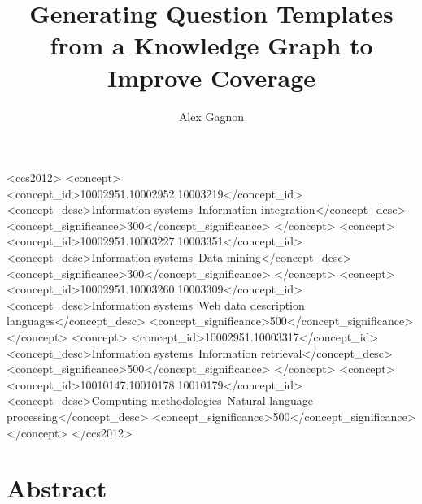 \documentclass[sigplan,screen]{acmart}
\begin{document}
\title{Generating Question Templates from a Knowledge Graph to Improve Coverage}

\author{Alex Gagnon}

\renewcommand{\shortauthors}{Gagnon}

\begin{CCSXML}
  <ccs2012>
     <concept>
         <concept_id>10002951.10002952.10003219</concept_id>
         <concept_desc>Information systems~Information integration</concept_desc>
         <concept_significance>300</concept_significance>
         </concept>
     <concept>
         <concept_id>10002951.10003227.10003351</concept_id>
         <concept_desc>Information systems~Data mining</concept_desc>
         <concept_significance>300</concept_significance>
         </concept>
     <concept>
         <concept_id>10002951.10003260.10003309</concept_id>
         <concept_desc>Information systems~Web data description languages</concept_desc>
         <concept_significance>500</concept_significance>
         </concept>
     <concept>
         <concept_id>10002951.10003317</concept_id>
         <concept_desc>Information systems~Information retrieval</concept_desc>
         <concept_significance>500</concept_significance>
         </concept>
     <concept>
         <concept_id>10010147.10010178.10010179</concept_id>
         <concept_desc>Computing methodologies~Natural language processing</concept_desc>
         <concept_significance>500</concept_significance>
         </concept>
   </ccs2012>
\end{CCSXML}



\maketitle

\section*{Abstract}
\end{document}

